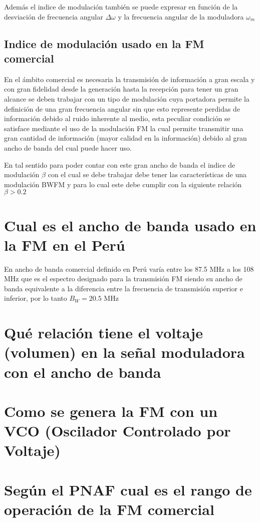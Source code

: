 \documentclass[]{article}
\begin{document}
	Además el indice de modulación también se puede expresar en función de la desviación de frecuencia angular  $\Delta\omega$ y la frecuencia angular de la moduladora $\omega_m$
	
	\subsection{Indice de modulación usado en la FM comercial}
	
	En el ámbito comercial es necesaria la transmisión de información a gran escala y con gran fidelidad desde la generación hasta la recepción para tener un gran alcance se deben trabajar con un tipo de modulación cuya portadora permite la definición de una gran frecuencia angular sin que esto represente perdidas de información debido al ruido inherente al medio, esta peculiar condición se satisface mediante el uso de la modulación FM la cual permite transmitir una gran cantidad de información (mayor calidad en la información) debido al gran ancho de banda del cual puede hacer uso.
	
	En tal sentido para poder contar con este gran ancho de banda el indice de modulación $\beta$ con el cual se debe trabajar debe tener las características de una modulación BWFM y para lo cual este debe cumplir con la siguiente relación $\beta > 0.2$
	
	\section{Cual es el ancho de banda usado en la FM en el Perú}
	
	En ancho de banda comercial definido en Perú varía entre los 87.5 MHz a los 108 MHz que es el espectro designado para la transmisión FM siendo su ancho de banda equivalente a la diferencia entre la frecuencia de transmisión superior e inferior, por lo tanto $B_W = 20.5$ MHz
	
	\section{Qué relación tiene el voltaje (volumen) en la señal moduladora con el ancho de banda}
	
	
	
	\section{Como se genera la FM con un VCO (Oscilador Controlado por Voltaje)}
	
	
	\section{Según el PNAF cual es el rango de operación de la FM comercial}
\end{document}
